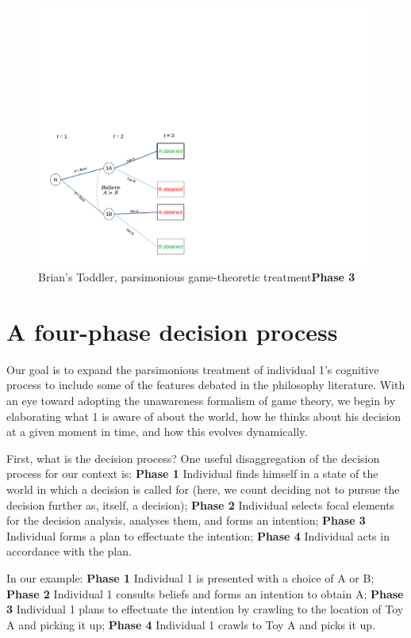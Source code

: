 \documentclass[
11pt,
titlepage,
reqno,
]{article}%
\theoremstyle{definition}
\begin{document}
\begin{figure}[h!]
	\centering
	\includegraphics*[page=1,trim = 0 0in 6in 4in,scale = .8]{Awareness_Diagrams_All}
	\caption{Brian's Toddler, parsimonious game-theoretic treatment\textbf{Phase 3} \label{Diag: p-01}}%
\end{figure}

\section*{A four-phase decision process}
Our goal is to expand the parsimonious treatment of individual 1's cognitive process to include some of the features debated in the philosophy literature. With an eye toward adopting the unawareness formalism of game theory, we begin by elaborating what 1 is aware of about the world, how he thinks about his decision at a given moment in time, and how this evolves dynamically. 

First, what is the decision process? One useful disaggregation of the decision process for our context is: \textbf{Phase 1} Individual finds himself in a state of the world in which a decision is called for (here, we count deciding not to pursue the decision further as, itself, a decision); \textbf{Phase 2} Individual selects focal elements for the decision analysis, analyses them, and forms an intention; \textbf{Phase 3} Individual forms a plan to effectuate the intention;  \textbf{Phase 4} Individual acts in accordance with the plan.

In our example: \textbf{Phase 1} Individual 1 is presented with a choice of A or B; \textbf{Phase 2} Individual 1 consults beliefs and forms an intention to obtain A; \textbf{Phase 3} Individual 1 plans to effectuate the intention by crawling to the location of Toy A and picking it up; \textbf{Phase 4} Individual 1 crawls to Toy A and picks it up. 
\end{document}
